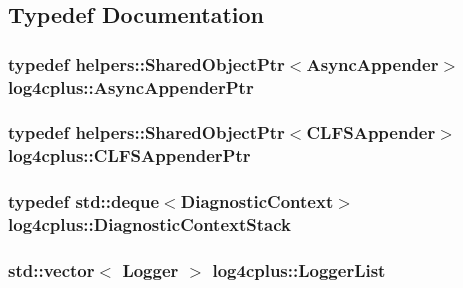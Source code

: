 \subsection{Typedef Documentation}
\hypertarget{namespacelog4cplus_ae8c69ec314f5839d527a425519f904b1}{
\subsubsection[{Async\-Appender\-Ptr}]{\setlength{\rightskip}{0pt plus 5cm}typedef {\bf helpers\-::\-Shared\-Object\-Ptr}$<${\bf Async\-Appender}$>$ {\bf log4cplus\-::\-Async\-Appender\-Ptr}}}\label{namespacelog4cplus_ae8c69ec314f5839d527a425519f904b1}
\hypertarget{namespacelog4cplus_acef2a286e5e50f87df800d6cc19b26a1}{
\subsubsection[{C\-L\-F\-S\-Appender\-Ptr}]{\setlength{\rightskip}{0pt plus 5cm}typedef {\bf helpers\-::\-Shared\-Object\-Ptr}$<${\bf C\-L\-F\-S\-Appender}$>$ {\bf log4cplus\-::\-C\-L\-F\-S\-Appender\-Ptr}}}\label{namespacelog4cplus_acef2a286e5e50f87df800d6cc19b26a1}
\hypertarget{namespacelog4cplus_ac62a7721683971c9b4f2b697aa7f03fb}{
\subsubsection[{Diagnostic\-Context\-Stack}]{\setlength{\rightskip}{0pt plus 5cm}typedef std\-::deque$<${\bf Diagnostic\-Context}$>$ {\bf log4cplus\-::\-Diagnostic\-Context\-Stack}}}\label{namespacelog4cplus_ac62a7721683971c9b4f2b697aa7f03fb}
\hypertarget{namespacelog4cplus_a9bad705b454c9c31bd84d97837fec22f}{
\subsubsection[{Logger\-List}]{\setlength{\rightskip}{0pt plus 5cm}std\-::vector$<$ {\bf Logger} $>$ {\bf log4cplus\-::\-Logger\-List}}}\label{namespacelog4cplus_a9bad705b454c9c31bd84d97837fec22f}
